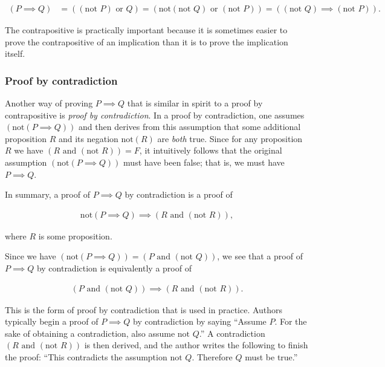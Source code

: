 \begin{align*}
    (P \implies Q) &= ((\text{not } P) \text{ or } Q ) 
    = (\text{not}(\text{not } Q) \text{ or } (\text{not } P))
    = ((\text{not } Q) \implies (\text{not } P)).
\end{align*}

The contrapositive is practically important because it is sometimes easier to prove the contrapositive of an implication than it is to prove the implication itself.

\subsubsection*{Proof by contradiction}

Another way of proving $P \implies Q$ that is similar in spirit to a proof by contrapositive is \textit{proof by contradiction}. In a proof by contradiction, one assumes $(\text{not}(P \implies Q))$ and then derives from this assumption that some additional proposition $R$ and its negation $\text{not}(R)$ are \textit{both} true. Since for any proposition $R$ we have $(R \text{ and } (\text{not } R)) = F$, it intuitively follows that the original assumption $(\text{not}(P \implies Q))$ must have been false; that is, we must have $P \implies Q$.

In summary, a proof of $P \implies Q$ by contradiction is a proof of

\begin{align*}
    \text{not}(P \implies Q) \implies (R \text{ and } (\text{not } R)),
\end{align*}

where $R$ is some proposition.

Since we have $(\text{not}(P \implies Q)) = (P \text{ and } (\text{not } Q))$, we see that a proof of $P \implies Q$ by contradiction is equivalently a proof of

\begin{align*}
    (P \text{ and } (\text{not } Q)) \implies (R \text{ and } (\text{not } R)).
\end{align*}

This is the form of proof by contradiction that is used in practice. Authors typically begin a proof of $P \implies Q$ by contradiction by saying ``Assume $P$. For the sake of obtaining a contradiction, also assume $\text{not } Q$.'' A contradiction $(R \text{ and } (\text{not } R))$ is then derived, and the author writes the following to finish the proof: ``This contradicts the assumption $\text{not } Q$. Therefore $Q$ must be true.'' 

